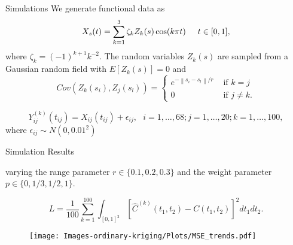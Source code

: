 \documentclass{beamer}
\newcommand{\norm}[1]{\left\|#1\right\|}
\begin{document}
\begin{frame}[t]{Simulations}
	We generate functional data as
	\begin{equation*}
		X_s(t) = \sum^{3}_{k=1}\zeta_k Z_k(s) \cos(k\pi t) \hspace{0.5cm} t \in [0,1],
		\label{eq:sim process2}
	\end{equation*}
	where \(\zeta_k=(-1)^{k+1}k^{-2}\). The random variables $Z_k(s)$ are sampled from a Gaussian random field with $E[Z_k(s)]=0$ and
	\begin{equation*}
		Cov(Z_k(s_i), Z_j(s_l)) = \begin{cases}
																	e^{-\norm{s_i - s_l}/r} &\mbox{ if } k = j\\
																	0 & \mbox{ if } j \neq k.
																\end{cases}
	\end{equation*}

	\begin{equation*}
		Y^{(k)}_{ij}(t_{ij}) = X_{ij}(t_{ij}) + \epsilon_{ij}, \mbox{ } i = 1, \dots, 68; j = 1, \dots, 20; k = 1, \dots, 100,
	\end{equation*}
	where $\epsilon_{ij} \sim N(0, 0.01^2)$


\end{frame}

\begin{frame}[t]{Simulation Results}

		varying the range parameter $r \in \{0.1, 0.2, 0.3\}$ and the weight parameter $p \in \{0, 1/3, 1/2, 1\}$.

		\begin{equation*}
			L = \frac{1}{100}\sum_{k=1}^{100}\int_{[0,1]^2} [\hat{C}^{(k)}(t_1, t_2) - C(t_1,t_2)]^2dt_1dt_2.
		\end{equation*}
\begin{minipage}{0.98\textwidth}
		\begin{figure}[h]
			\begin{center}
				\texttt{[image: Images-ordinary-kriging/Plots/MSE\_trends.pdf]}
			\end{center}
		\end{figure}
	\end{minipage}

\end{frame}
\end{document}
